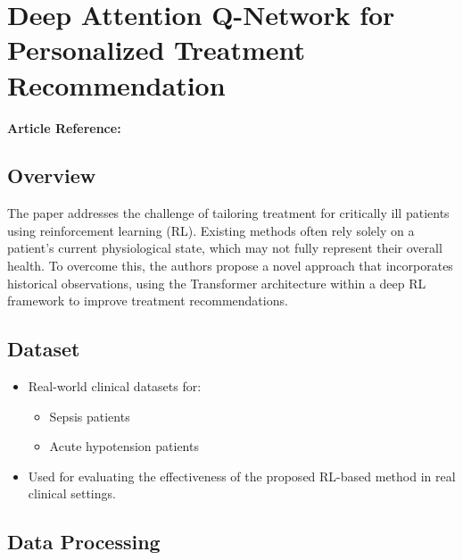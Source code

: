 \section{Deep Attention Q-Network for Personalized Treatment Recommendation}
\textbf{Article Reference:} \cite{maDeepAttentionQnetwork2023}

\subsection*{Overview}
The paper  addresses the challenge of tailoring treatment for critically ill patients using reinforcement learning (RL). Existing methods often rely solely on a patient's current physiological state, which may not fully represent their overall health. To overcome this, the authors propose a novel approach that incorporates historical observations, using the Transformer architecture within a deep RL framework to improve treatment recommendations.

\subsection*{Dataset}
\begin{itemize}
    \item Real-world clinical datasets for:
    \begin{itemize}
        \item Sepsis patients
        \item Acute hypotension patients
    \end{itemize}
    \item Used for evaluating the effectiveness of the proposed RL-based method in real clinical settings.
\end{itemize}

\subsection*{Data Processing}

